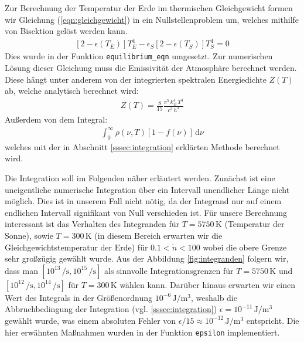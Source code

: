 \documentclass[10pt,a4paper]{article}
\begin{document}
Zur Berechnung der Temperatur der Erde im thermischen Gleichgewicht formen wir Gleichung (\ref{eqn:gleichgewicht}) in ein Nullstellenproblem um, welches mithilfe von Bisektion gelöst werden kann.
\begin{align}
	\left[2-\epsilon(T_E)\right]T_E^4 - \epsilon_S\left[2-\epsilon(T_S)\right]T_S^4 = 0
	\label{eq:nullstellenproblem}
\end{align}
Dies wurde in der Funktion \texttt{equilibrium\_eqn} umgesetzt. Zur numerischen Lösung dieser Gleichung muss die Emissivität der Atmosphäre berechnet werden. Diese hängt unter anderem von der integrierten spektralen Energiedichte $Z(T)$ ab, welche analytisch berechnet wird:
\begin{align}
	Z(T) = \frac{8}{15} \frac{\pi^5 \, k_B^4 \, T^4}{c^3 \, h^3}
\end{align}
Außerdem von dem Integral:
\begin{align}
	\int_0^\infty \rho(\nu,T)[1 - f(\nu)] \, \mathrm{d}\nu
\end{align}
welches mit der in Abschnitt \ref{sssec:integration} erklärten Methode berechnet wird.

Die Integration soll im Folgenden näher erläutert werden. Zunächst ist eine uneigentliche numerische Integration über ein Intervall unendlicher Länge nicht möglich. Dies ist in unserem Fall nicht nötig, da der Integrand nur auf einem endlichen Intervall signifikant von Null verschieden ist. Für unsere Berechnung interessant ist das Verhalten des Integranden für $T = \num{5750}\,\si{\kelvin}$ (Temperatur der Sonne), sowie $T = \num{300}\,\si{\kelvin}$ (in diesem Bereich erwarten wir die Gleichgewichtstemperatur der Erde) für $\num{0.1} < \tilde{n} < \num{100}$ wobei die obere Grenze sehr großzügig gewählt wurde. Aus der Abbildung \ref{fig:integranden} folgern wir, dass man $[10^{13}\,\si{\per\second},10^{15}\,\si{\per\second}]$ als sinnvolle Integrationsgrenzen für $T = \num{5750}\,\si{\kelvin}$ und $[10^{12}\,\si{\per\second}, 10^{14}\,\si{\per\second}]$ für $T = \num{300}\,\si{\kelvin}$ wählen kann. Darüber hinaus erwarten wir einen Wert des Integrals in der Größenordnung $10^{-6}\,\si{\joule\per\metre^3}$, weshalb die Abbruchbedingung der Integration (vgl. \ref{sssec:integration}) $\epsilon = 10^{-11}\,\si{\joule\per\metre^3}$ gewählt wurde, was einem absoluten Fehler von $\epsilon / 15 \approx 10^{-12}\,\si{\joule\per\metre^3}$ entspricht. Die hier erwähnten Maßnahmen wurden in der Funktion \texttt{epsilon} implementiert.
\end{document}
